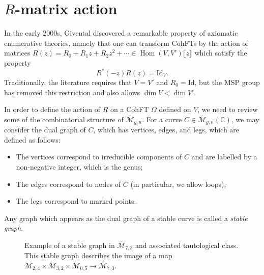 \documentclass{amsart}
\theoremstyle{definition}
\theoremstyle{remark}
\theoremstyle{plain}
\theoremstyle{definition}
\theoremstyle{remark}
\newcommand{\C}{\mathbb{C}}
\newcommand{\Mbar}{\overline{\mathcal{M}}}
\newcommand{\mc}[1]{\mathcal{#1}}
\newcommand{\mr}[1]{\mathrm{#1}}
\newcommand{\ol}[1]{\overline{#1}}
\newcommand{\1}{\mathbf{1}}
\newcommand{\2}{\mathbf{2}}
\newcommand{\3}{\mathbf{3}}
\newcommand{\ps}[1]{\llbracket #1 \rrbracket}
\DeclareMathOperator{\Hom}{Hom}
\begin{document}
\section{$R$-matrix action}%
\label{sec:R-matrix action}

In the early 2000s, Givental discovered a remarkable property of axiomatic enumerative theories, namely that one can transform CohFTs by the action of matrices $R(z) = R_0 + R_1 z + R_2 z^2 + \cdots \in \Hom(V, V')\ps{z}$ which satisfy the property
\[ R^*(-z) R(z) = \mr{Id}_V. \]
Traditionally, the literature requires that $V = V'$ and $R_0 = \mr{Id}$, but the MSP group has removed this restriction and also allows $\dim V < \dim V'$.

In order to define the action of $R$ on a CohFT $\Omega$ defined on $V$, we need to review some of the combinatorial structure of $\Mbar_{g,n}$. For a curve $C\in \Mbar_{g,n}(\C)$, we may consider the dual graph of $C$, which has vertices, edges, and legs, which are defined as follows:
\begin{itemize}
    \item The vertices correspond to irreducible components of $C$ and are labelled by a non-negative integer, which is the genus;
    \item The edges correspond to nodes of $C$ (in particular, we allow loops);
    \item The legs correspond to marked points.
\end{itemize}
Any graph which appears as the dual graph of a stable curve is called a \textit{stable graph}.

\begin{figure}[htpb]
  \centering
  \caption{Example of a stable graph in $\ol{\mc{M}}_{7,3}$ and associated tautological class. This stable graph describes the image of a map
    $\ol{\mc{M}}_{2,4} \times \ol{\mc{M}}_{3,2} \times \ol{\mc{M}}_{0,5} \to \ol{\mc{M}}_{7,3}$.}
  \label{fig:stablegraph}
\end{figure}
\end{document}
